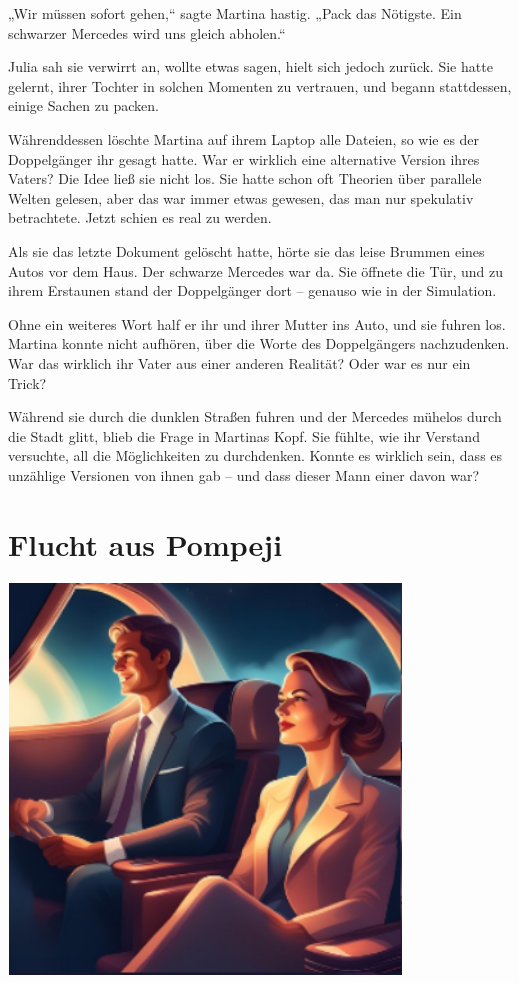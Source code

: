 \documentclass[
]{article}
\begin{document}
„Wir müssen sofort gehen,`` sagte Martina hastig. „Pack das Nötigste.
Ein schwarzer Mercedes wird uns gleich abholen.``

Julia sah sie verwirrt an, wollte etwas sagen, hielt sich jedoch zurück.
Sie hatte gelernt, ihrer Tochter in solchen Momenten zu vertrauen, und
begann stattdessen, einige Sachen zu packen.

Währenddessen löschte Martina auf ihrem Laptop alle Dateien, so wie es
der Doppelgänger ihr gesagt hatte. War er wirklich eine alternative
Version ihres Vaters? Die Idee ließ sie nicht los. Sie hatte schon oft
Theorien über parallele Welten gelesen, aber das war immer etwas
gewesen, das man nur spekulativ betrachtete. Jetzt schien es real zu
werden.

Als sie das letzte Dokument gelöscht hatte, hörte sie das leise Brummen
eines Autos vor dem Haus. Der schwarze Mercedes war da. Sie öffnete die
Tür, und zu ihrem Erstaunen stand der Doppelgänger dort -- genauso wie
in der Simulation.

Ohne ein weiteres Wort half er ihr und ihrer Mutter ins Auto, und sie
fuhren los. Martina konnte nicht aufhören, über die Worte des
Doppelgängers nachzudenken. War das wirklich ihr Vater aus einer anderen
Realität? Oder war es nur ein Trick?

Während sie durch die dunklen Straßen fuhren und der Mercedes mühelos
durch die Stadt glitt, blieb die Frage in Martinas Kopf. Sie fühlte, wie
ihr Verstand versuchte, all die Möglichkeiten zu durchdenken. Konnte es
wirklich sein, dass es unzählige Versionen von ihnen gab -- und dass
dieser Mann einer davon war?

\section{Flucht aus Pompeji}\label{flucht-aus-pompeji}

\includegraphics[width=4.11614in,height=4.08663in]{media/image9.png}
\end{document}
